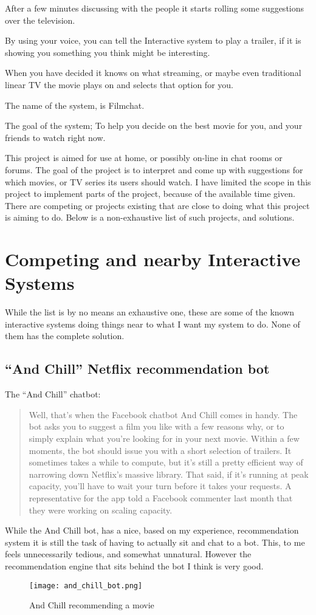 \documentclass[11pt,fleqn]{book} %
\begin{document}
After a few minutes discussing with the people it starts rolling some suggestions over the television. 

By using your voice, you can tell the Interactive system to play a trailer, if it is showing you something you think might be interesting.

When you have decided it knows on what streaming, or maybe even traditional linear TV the movie plays on and selects that option for you.

The name of the system, is Filmchat.

The goal of the system; To help you decide on the best movie for you, and your friends to watch right now.

This project is aimed for use at home, or possibly on-line in chat rooms or forums. The goal of the project is to interpret and come up with suggestions for which movies, or TV series its users should watch. I have limited the scope in this project to implement parts of the project, because of the available time given.
There are competing or projects existing that are close to doing what this project is aiming to do. Below is a non-exhaustive list of such projects, and solutions.
\section{Competing and nearby Interactive Systems}
While the list is by no means an exhaustive one, these are some of the known interactive systems doing things near to what I want my system to do. None of them has the complete solution.
\subsection{“And Chill” Netflix recommendation bot}
The “And Chill” chatbot:
\begin{quote}
Well, that’s when the Facebook chatbot And Chill comes in handy. The bot asks you to suggest a film you like with a few reasons why, or to simply explain what you’re looking for in your next movie.  
Within a few moments, the bot should issue you with a short selection of trailers. It sometimes takes a while to compute, but it’s still a pretty efficient way of narrowing down Netflix’s massive library.
That said, if it’s running at peak capacity, you’ll have to wait your turn before it takes your requests. A representative for the app told a Facebook commenter last month that they were working on scaling capacity.\cite{Williams2016TheUK}
\end{quote}
While the And Chill bot, has a nice, based on my experience, recommendation system it is still the task of having to actually sit and chat to a bot. This, to me feels unnecessarily tedious, and somewhat unnatural. However the recommendation engine that sits behind the bot I think is very good. 
\begin{figure}[]
  \centering
   \texttt{[image: and\_chill\_bot.png]}
  \caption{And Chill recommending a movie}
  \label{fig:and_chill}
\end{figure}
\end{document}

